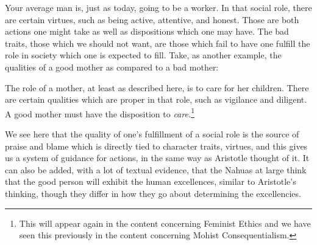 Your average man is, just as today, going to be a worker. In that social role, there are certain virtues, such as being active, attentive, and honest. Those are both actions one might take as well as dispositions which one may have. The bad traits, those which we should not want, are those which fail to have one fulfill the role in society which one is expected to fill. Take, as another example, the qualities of a good mother as compared to a bad mother: 


The role of a mother, at least as described here, is to care for her children. There are certain qualities which are proper in that role, such as vigilance and diligent. A good mother must have the disposition to \emph{care.}\footnote{This will appear again in the content concerning Feminist Ethics and we have seen this previously in the content concerning Mohist Consequentialism.} 

We see here that the quality of one's fulfillment of a social role is the source of praise and blame which is directly tied to character traits, virtues, and this gives us a system of guidance for actions, in the same way as Aristotle thought of it. It can also be added, with a lot of textual evidence, that the Nahuas at large think that the good person will exhibit the human excellences, similar to Aristotle's thinking, though they differ in how they go about determining the excellencies.

